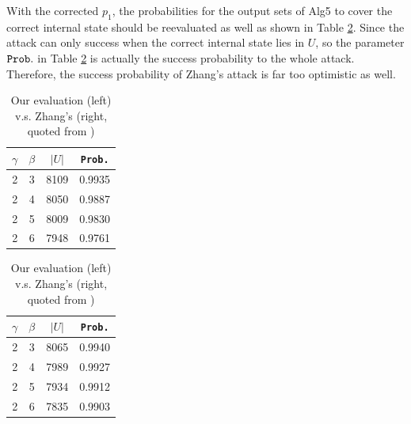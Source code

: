 With the corrected $p_1$, the probabilities for the output sets of Alg5 to cover the correct internal state should be reevaluated as well as shown in Table \ref{tab:ProbInU}.
Since the attack can only success when the correct internal state lies in $U$, so the parameter ${\tt Prob.}$ in Table \ref{tab:ProbInU} is actually the success probability to the whole attack.
Therefore, the success probability of Zhang's attack is far too optimistic as well.
\begin{table}[htbp]
  \centering
  \caption{Our evaluation (left) v.s. Zhang's (right, quoted from \cite{AC:Zhang19})}
  \begin{minipage}[t]{0.45\textwidth}
  \centering
     \begin{tabular}{c|c|c|c}
    \hline
    $\gamma$ & $\beta$ & $|U|$ & {\tt Prob.} \\
    \hline
    \hline
    2     & 3     & 8109  & 0.9935 \\
    2     & 4     & 8050  & 0.9887 \\
    2     & 5     & 8009  & 0.9830 \\
    2     & 6     & 7948  & 0.9761 \\
    \hline
    \end{tabular}%
  \end{minipage}
  \begin{minipage}[t]{0.45\textwidth}
    \centering
        \begin{tabular}{c|c|c|c}
    \hline
    $\gamma$ & $\beta$ & $|U|$ & {\tt Prob.} \\
    \hline
    \hline
    2     & 3     & 8065  & 0.9940 \\
    2     & 4     & 7989  & 0.9927 \\
    2     & 5     & 7934  & 0.9912 \\
    2     & 6     & 7835  & 0.9903 \\
    \hline
    \end{tabular}%
  \end{minipage}
  \label{tab:ProbInU}%
\end{table}%

